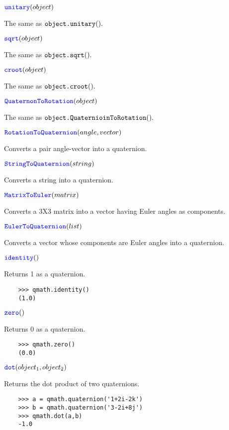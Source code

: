 \documentclass[11pt]{paper}
\begin{document}
\medskip
\noindent $\textcolor{blue}{\texttt{\mbox{unitary}}}(object)$ 

The same as $\texttt{\mbox{object.unitary}}().$

\medskip
\noindent $\textcolor{blue}{\texttt{\mbox{sqrt}}}(object)$ 

The same as $\texttt{\mbox{object.sqrt}}().$

\medskip
\noindent $\textcolor{blue}{\texttt{\mbox{croot}}}(object)$ 

The same as $\texttt{\mbox{object.croot}}().$

\medskip
\noindent $\textcolor{blue}{\texttt{\mbox{QuaternonToRotation}}}(object)$ 

The same as $\texttt{\mbox{object.QuaternioinToRotation}}().$

\medskip
\noindent $\textcolor{blue}{\texttt{\mbox{RotationToQuaternion}}}(angle,vector)$ 

Converts a pair angle-vector into a quaternion.


\medskip
\noindent $\textcolor{blue}{\texttt{\mbox{StringToQuaternion}}}(string)$ 

Converts a string into a quaternion.

\medskip
\noindent $\textcolor{blue}{\texttt{\mbox{MatrixToEuler}}}(matrix)$ 

Converts a 3X3 matrix into a vector having Euler angles as components.

\medskip
\noindent $\textcolor{blue}{\texttt{\mbox{EulerToQuaternion}}}(list)$ 

Converts a vector whose components are Euler angles into a quaternion.
    

\medskip
\noindent $\textcolor{blue}{\texttt{\mbox{identity}}}()$ 

Returns 1 as a quaternion.
\begin{verbatim}
    >>> qmath.identity()
    (1.0)
\end{verbatim}
\medskip
\noindent $\textcolor{blue}{\texttt{\mbox{zero}}}()$ 

Returns 0 as a quaternion.
\begin{verbatim}
    >>> qmath.zero()
    (0.0)
\end{verbatim}

\medskip
\noindent $\textcolor{blue}{\texttt{\mbox{dot}}}(object_1,object_2)$ 

Returns the dot product of two quaternions.
\begin{verbatim}
    >>> a = qmath.quaternion('1+2i-2k')
    >>> b = qmath.quaternion('3-2i+8j')
    >>> qmath.dot(a,b)
    -1.0
\end{verbatim}
\end{document}
